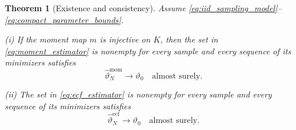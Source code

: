 \documentclass[11pt]{amsart}
\numberwithin{equation}{section}\setcounter{tocdepth}{3}\setcounter{secnumdepth}{3}
\newtheorem{theorem}{Theorem}[section]\newtheorem{proposition}[theorem]{Proposition}
\begin{document}
\begin{theorem}[Existence and consistency]\label{thm:inference_consistency}
Assume \eqref{eq:iid_sampling_model}--\eqref{eq:compact_parameter_bounds}.

\emph{(i)} If the moment map $m$ is injective on $K$, then the set in
\eqref{eq:moment_estimator} is nonempty for every sample and every sequence of its
minimizers satisfies
\begin{equation}
 \widehat\vartheta_N^{\mathrm{mom}}\longrightarrow\vartheta_0
 \quad\text{almost surely}.
 \label{eq:moment_strong_consistency}
\end{equation}

\emph{(ii)} The set in \eqref{eq:ecf_estimator} is nonempty for every sample and every
sequence of its minimizers satisfies
\begin{equation}
 \widehat\vartheta_N^{\mathrm{ecf}}\longrightarrow\vartheta_0
 \quad\text{almost surely}.
 \label{eq:ecf_strong_consistency}
\end{equation}
\end{theorem}
\end{document}
